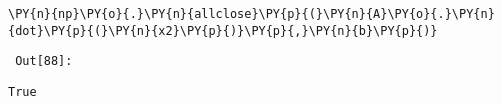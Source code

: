 {\par%
\vspace{-1\baselineskip}%
}%
\begin{notebookcell}[88]%
\begin{addmargin}[\cellleftmargin]{0em}%
{\smaller%
\par%
%
\vspace{-1\smallerfontscale}%
\begin{Verbatim}[commandchars=\\\{\}]
\PY{n}{np}\PY{o}{.}\PY{n}{allclose}\PY{p}{(}\PY{n}{A}\PY{o}{.}\PY{n}{dot}\PY{p}{(}\PY{n}{x2}\PY{p}{)}\PY{p}{,}\PY{n}{b}\PY{p}{)}
\end{Verbatim}
%
\par%
\vspace{-1\smallerfontscale}}%
\end{addmargin}
\end{notebookcell}

\par\vspace{1\smallerfontscale}%
    
        {\par%
        \vspace{-1\smallerfontscale}%
        \noindent%
        \begin{minipage}{\cellleftmargin}%
    \hfill%
    {\smaller%
    \tt%
    \color{nbframe-out-prompt}%
    Out[88]:}%
    \hspace{\inputpadding}%
    \hspace{0em}%
    \hspace{3pt}%
    \end{minipage}%
        }%
    \begin{addmargin}[\cellleftmargin]{0em}%
    {\smaller%
    \vspace{-1\smallerfontscale}%
    
    
    
    \begin{verbatim}
True
    \end{verbatim}

    
}%
    \end{addmargin}%

